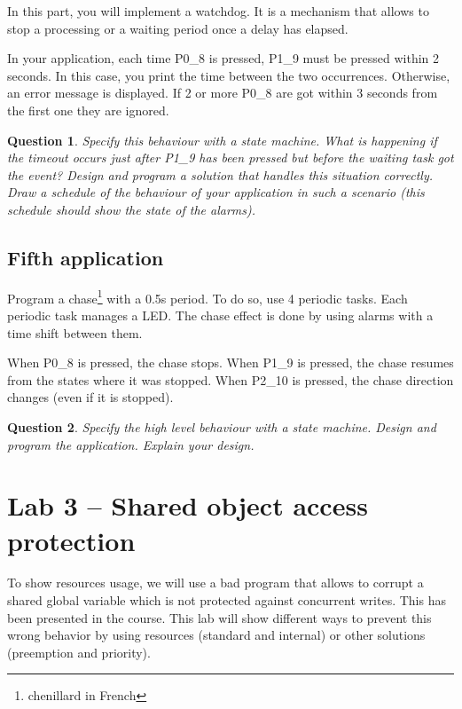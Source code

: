 \documentclass[11pt]{report}
\newtheorem{ex}{Question}
\begin{document}
In this part, you will implement a watchdog. It is a mechanism that allows to stop a processing or a waiting period once a delay has elapsed.

In your application, each time P0_8 is pressed, P1_9 must be pressed within 2 seconds. In this case, you print the time between the two occurrences. Otherwise, an error message is displayed. If 2 or more P0_8 are got within 3 seconds from the first one they are ignored.

\begin{ex}
    Specify this behaviour with a state machine.
    What is happening if the timeout occurs just after P1_9 has been pressed but before the waiting task got the event?
    Design and program a solution that handles this situation correctly.
    Draw a schedule of the behaviour of your application in such a scenario (this schedule should show the state of the alarms).
\end{ex}

\section{Fifth application}

Program a chase\footnote{chenillard in French} with a 0.5s period. To do so, use 4 periodic tasks. Each periodic task manages a LED. The chase effect is done by using alarms with a time shift between them.

When P0_8 is pressed, the chase stops.
When P1_9 is pressed, the chase resumes from the states where it was stopped.
When P2_10 is pressed, the chase direction changes (even if it is stopped).

\begin{ex}
    Specify the high level behaviour with a state machine.
    Design and program the application.
    Explain your design.
\end{ex}

\chapter{Lab 3 -- Shared object access protection}

To show resources usage, we will use a bad program that allows to corrupt a shared global variable which is not protected against concurrent writes. This has been presented in the course. This lab will show different ways to prevent this wrong behavior by using resources (standard and internal) or other solutions (preemption and priority).
\end{document}
